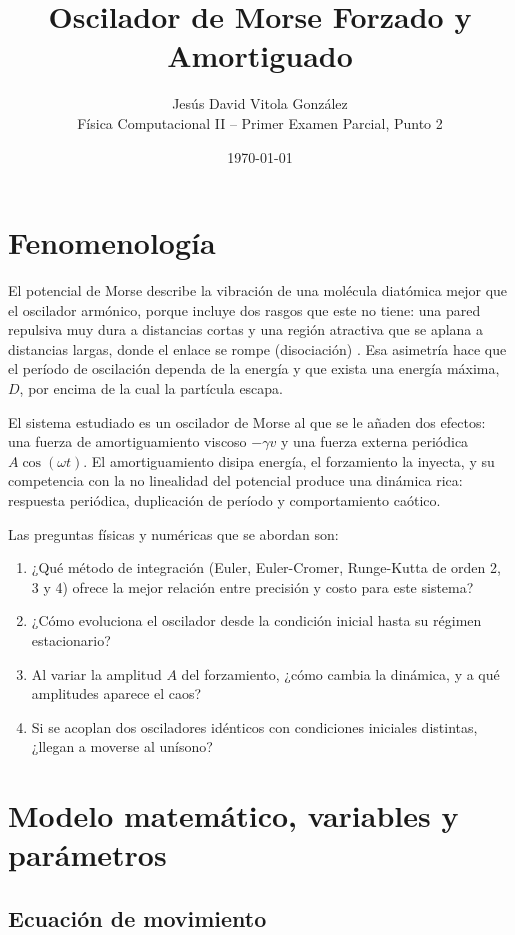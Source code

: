 \documentclass[12pt,a4paper]{article}
\title{\textbf{Oscilador de Morse Forzado y Amortiguado}}
\author{Jesús David Vitola González\\[2pt] Física Computacional II -- Primer Examen Parcial, Punto 2}
\date{\today}
\begin{document}
\maketitle

\section{Fenomenología}

El potencial de Morse describe la vibración de una molécula diatómica mejor que el oscilador armónico, porque incluye dos rasgos que este no tiene: una pared repulsiva muy dura a distancias cortas y una región atractiva que se aplana a distancias largas, donde el enlace se rompe (disociación) \cite{morse1929}. Esa asimetría hace que el período de oscilación dependa de la energía y que exista una energía máxima, $D$, por encima de la cual la partícula escapa.

El sistema estudiado es un oscilador de Morse al que se le añaden dos efectos: una fuerza de amortiguamiento viscoso $-\gamma v$ y una fuerza externa periódica $A\cos(\omega t)$. El amortiguamiento disipa energía, el forzamiento la inyecta, y su competencia con la no linealidad del potencial produce una dinámica rica: respuesta periódica, duplicación de período y comportamiento caótico.

Las preguntas físicas y numéricas que se abordan son:
\begin{enumerate}[label=\textbf{\arabic*.}]
    \item ¿Qué método de integración (Euler, Euler-Cromer, Runge-Kutta de orden 2, 3 y 4) ofrece la mejor relación entre precisión y costo para este sistema?
    \item ¿Cómo evoluciona el oscilador desde la condición inicial hasta su régimen estacionario?
    \item Al variar la amplitud $A$ del forzamiento, ¿cómo cambia la dinámica, y a qué amplitudes aparece el caos?
    \item Si se acoplan dos osciladores idénticos con condiciones iniciales distintas, ¿llegan a moverse al unísono?
\end{enumerate}

\section{Modelo matemático, variables y parámetros}

\subsection{Ecuación de movimiento}
\end{document}
